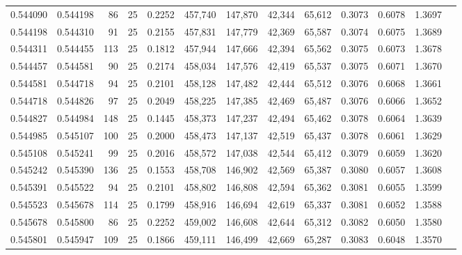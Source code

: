 \begin{tabular}{rrrrrrrrrrrrr}
0.544090 & 0.544198 &    86 &  25 &                                     0.2252 & 457,740 & 147,870 &  42,344 &  65,612 & 0.3073 & 0.6078 & 1.3697 \\
0.544198 & 0.544310 &    91 &  25 &                                     0.2155 & 457,831 & 147,779 &  42,369 &  65,587 & 0.3074 & 0.6075 & 1.3689 \\
0.544311 & 0.544455 &   113 &  25 &                                     0.1812 & 457,944 & 147,666 &  42,394 &  65,562 & 0.3075 & 0.6073 & 1.3678 \\
0.544457 & 0.544581 &    90 &  25 &                                     0.2174 & 458,034 & 147,576 &  42,419 &  65,537 & 0.3075 & 0.6071 & 1.3670 \\
0.544581 & 0.544718 &    94 &  25 &                                     0.2101 & 458,128 & 147,482 &  42,444 &  65,512 & 0.3076 & 0.6068 & 1.3661 \\
0.544718 & 0.544826 &    97 &  25 &                                     0.2049 & 458,225 & 147,385 &  42,469 &  65,487 & 0.3076 & 0.6066 & 1.3652 \\
0.544827 & 0.544984 &   148 &  25 &                                     0.1445 & 458,373 & 147,237 &  42,494 &  65,462 & 0.3078 & 0.6064 & 1.3639 \\
0.544985 & 0.545107 &   100 &  25 &                                     0.2000 & 458,473 & 147,137 &  42,519 &  65,437 & 0.3078 & 0.6061 & 1.3629 \\
0.545108 & 0.545241 &    99 &  25 &                                     0.2016 & 458,572 & 147,038 &  42,544 &  65,412 & 0.3079 & 0.6059 & 1.3620 \\
0.545242 & 0.545390 &   136 &  25 &                                     0.1553 & 458,708 & 146,902 &  42,569 &  65,387 & 0.3080 & 0.6057 & 1.3608 \\
0.545391 & 0.545522 &    94 &  25 &                                     0.2101 & 458,802 & 146,808 &  42,594 &  65,362 & 0.3081 & 0.6055 & 1.3599 \\
0.545523 & 0.545678 &   114 &  25 &                                     0.1799 & 458,916 & 146,694 &  42,619 &  65,337 & 0.3081 & 0.6052 & 1.3588 \\
0.545678 & 0.545800 &    86 &  25 &                                     0.2252 & 459,002 & 146,608 &  42,644 &  65,312 & 0.3082 & 0.6050 & 1.3580 \\
0.545801 & 0.545947 &   109 &  25 &                                     0.1866 & 459,111 & 146,499 &  42,669 &  65,287 & 0.3083 & 0.6048 & 1.3570 \\

\end{tabular}
